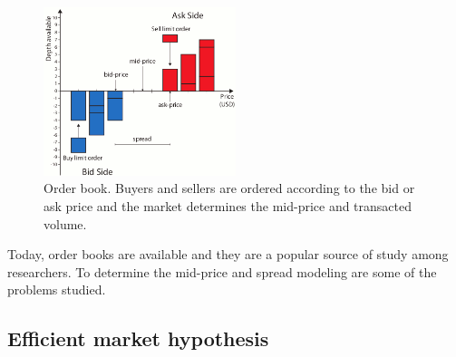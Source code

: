 \begin{figure}[!h]
  \centering
  \includegraphics[width=0.5\textwidth]{img/orderbook}
  \caption{Order book. Buyers and sellers are ordered according to the bid or
  ask price and the market determines the mid-price and transacted volume.}
  \label{fig:orderbook}
\end{figure}

Today, order books are available and they are a popular source of study among
researchers. To determine the mid-price and spread modeling are some of the
problems studied.


\subsection{Efficient market hypothesis}


